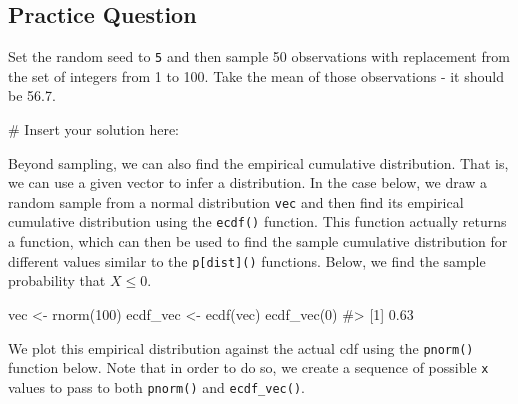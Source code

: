 \documentclass[
  letterpaper,
]{krantz}
\makeatletter
\newenvironment{Shaded}{\begin{snugshade}}{\end{snugshade}}
\newcommand{\CommentTok}[1]{\textcolor[rgb]{0.37,0.37,0.37}{#1}}
\newcommand{\DecValTok}[1]{\textcolor[rgb]{0.68,0.00,0.00}{#1}}
\newcommand{\FunctionTok}[1]{\textcolor[rgb]{0.28,0.35,0.67}{#1}}
\newcommand{\NormalTok}[1]{\textcolor[rgb]{0.00,0.23,0.31}{#1}}
\newcommand{\OtherTok}[1]{\textcolor[rgb]{0.00,0.23,0.31}{#1}}
\newenvironment{kframe}{%
\medskip{}
\setlength{\fboxsep}{.8em}
 \def\at@end@of@kframe{}%
 \ifinner\ifhmode%
  \def\at@end@of@kframe{\end{minipage}}%
  \begin{minipage}{\columnwidth}%
 \fi\fi%
 \def\FrameCommand##1{\hskip\@totalleftmargin \hskip-\fboxsep
 \colorbox{shadecolor}{##1}\hskip-\fboxsep
     \hskip-\linewidth \hskip-\@totalleftmargin \hskip\columnwidth}%
 \MakeFramed {\advance\hsize-\width
   \@totalleftmargin\z@ \linewidth\hsize
   \@setminipage}}%
 {\par\unskip\endMakeFramed%
 \at@end@of@kframe}
\renewenvironment{Shaded}{\begin{kframe}}{\end{kframe}}
\makeatother
\begin{document}
\subsection{Practice Question}\label{practice-question-16}

Set the random seed to \texttt{5} and then sample 50 observations with
replacement from the set of integers from 1 to 100. Take the mean of
those observations - it should be 56.7.

\begin{Shaded}
\begin{Highlighting}[]
\CommentTok{\# Insert your solution here:}
\end{Highlighting}
\end{Shaded}

Beyond sampling, we can also find the empirical cumulative distribution.
That is, we can use a given vector to infer a distribution. In the case
below, we draw a random sample from a normal distribution \texttt{vec}
and then find its empirical cumulative distribution using the
\texttt{ecdf()} function. This function actually returns a function,
which can then be used to find the sample cumulative distribution for
different values similar to the \texttt{p{[}dist{]}()} functions. Below,
we find the sample probability that \(X \leq 0\).

\begin{Shaded}
\begin{Highlighting}[]
\NormalTok{vec }\OtherTok{\textless{}{-}} \FunctionTok{rnorm}\NormalTok{(}\DecValTok{100}\NormalTok{) }
\NormalTok{ecdf\_vec }\OtherTok{\textless{}{-}} \FunctionTok{ecdf}\NormalTok{(vec)}
\FunctionTok{ecdf\_vec}\NormalTok{(}\DecValTok{0}\NormalTok{)}
\CommentTok{\#\textgreater{} [1] 0.63}
\end{Highlighting}
\end{Shaded}

We plot this empirical distribution against the actual cdf using the
\texttt{pnorm()} function below. Note that in order to do so, we create
a sequence of possible \texttt{x} values to pass to both
\texttt{pnorm()} and \texttt{ecdf\_vec()}.
\end{document}
